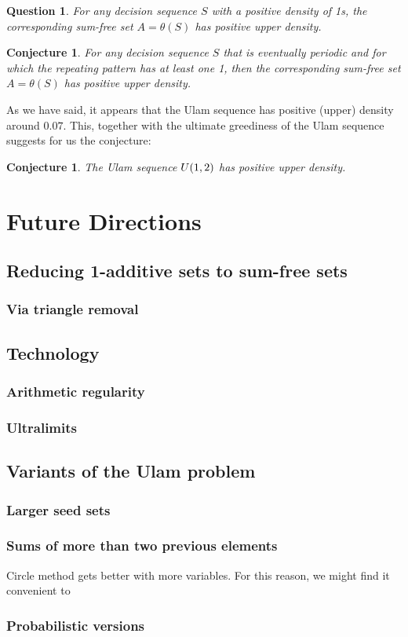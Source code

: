 \documentclass{article}
\newtheorem{conjecture}[theorem]{Conjecture}
\newtheorem{question}[theorem]{Question}
\theoremstyle{definition}
\theoremstyle{remark}
\numberwithin{equation}{section}
\begin{document}
{\begin{question}
  For any decision sequence $S$ with a positive density of 1s, the
  corresponding sum-free set $A = \theta(S)$ has positive upper density.
\end{question}

\begin{conjecture}
  For any decision sequence $S$ that is eventually periodic and for
  which the repeating pattern has at least one 1, then the
  corresponding sum-free set $A = \theta(S)$ has positive upper
  density.
\end{conjecture}

As we have said, it appears that the Ulam sequence has positive
(upper) density around $0.07$.  This, together with the ultimate
greediness of the Ulam sequence suggests for us the conjecture:

\begin{conjecture}
  The Ulam sequence $U(1,2)$ has positive upper density.
\end{conjecture}

\section{Future Directions}

\subsection{Reducing 1-additive sets to sum-free sets}

\subsubsection{Via triangle removal}

\subsection{Technology}

\subsubsection{Arithmetic regularity}

\subsubsection{Ultralimits}

\subsection{Variants of the Ulam problem}
\subsubsection{Larger seed sets}
\subsubsection{Sums of more than two previous elements}

Circle method gets better with more variables.  For this reason, we
might find it convenient to 

\subsubsection{Probabilistic versions}

}

{}

\end{document}
